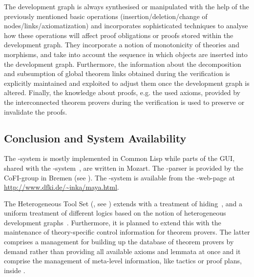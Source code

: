 The development graph is always synthesised or manipulated with the help of the
previously mentioned basic operations (insertion\slash deletion\slash change of
nodes\slash links\slash axiomatization) and {\maya} incorporates sophisticated
techniques to analyse how these operations will affect proof obligations or proofs
stored within the development graph. They incorporate a notion of monotonicity of
theories and morphisms, and take into account the sequence in which objects are
inserted into the development graph. Furthermore, the information about the
decomposition and subsumption of global theorem links obtained during the
verification {} is explicitly
maintained and exploited to adjust them once the development graph is altered.
Finally, the knowledge about proofs, e.g. the used axioms, provided by the
interconnected theorem provers during the verification
{} is used to preserve or
invalidate the proofs.

\subsection{Conclusion and System Availability}

The {\maya}-system is mostly implemented in Common Lisp while parts of the GUI, shared
with the {\OMEGA}-system~\cite{SieHes:loui99}, are written in Mozart. The {\casl}-parser
is provided by the CoFI-group in Bremen (see {}). The {\maya}-system is
available from the {\maya}-web-page at {\url{http://www.dfki.de/~inka/maya.html}}.

The Heterogeneous Tool Set ({\hets}, see ) extends {\maya} with a treatment
of hiding~\cite{MAH-06-a}, and a uniform treatment of different logics based on the notion
of heterogeneous development graphs~\cite{Mossakowski:tdghb02}.  Furthermore, it is planned
to extend this with the maintenance of theory-specific control information for theorem
provers. The latter comprises a management for building up the database of theorem provers
by demand rather than providing all available axioms and lemmata at once and it comprise
the management of meta-level information, like tactics or proof plans, inside {\maya}.

